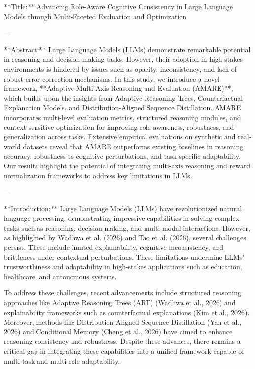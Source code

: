**Title:** Advancing Role-Aware Cognitive Consistency in Large Language Models through Multi-Faceted Evaluation and Optimization

---

**Abstract:**  
Large Language Models (LLMs) demonstrate remarkable potential in reasoning and decision-making tasks. However, their adoption in high-stakes environments is hindered by issues such as opacity, inconsistency, and lack of robust error-correction mechanisms. In this study, we introduce a novel framework, **Adaptive Multi-Axis Reasoning and Evaluation (AMARE)**, which builds upon the insights from Adaptive Reasoning Trees, Counterfactual Explanation Models, and Distribution-Aligned Sequence Distillation. AMARE incorporates multi-level evaluation metrics, structured reasoning modules, and context-sensitive optimization for improving role-awareness, robustness, and generalization across tasks. Extensive empirical evaluations on synthetic and real-world datasets reveal that AMARE outperforms existing baselines in reasoning accuracy, robustness to cognitive perturbations, and task-specific adaptability. Our results highlight the potential of integrating multi-axis reasoning and reward normalization frameworks to address key limitations in LLMs.

---

**Introduction:**  
Large Language Models (LLMs) have revolutionized natural language processing, demonstrating impressive capabilities in solving complex tasks such as reasoning, decision-making, and multi-modal interactions. However, as highlighted by Wadhwa et al. (2026) and Tao et al. (2026), several challenges persist. These include limited explainability, cognitive inconsistency, and brittleness under contextual perturbations. These limitations undermine LLMs' trustworthiness and adaptability in high-stakes applications such as education, healthcare, and autonomous systems.

To address these challenges, recent advancements include structured reasoning approaches like Adaptive Reasoning Trees (ART) (Wadhwa et al., 2026) and explainability frameworks such as counterfactual explanations (Kim et al., 2026). Moreover, methods like Distribution-Aligned Sequence Distillation (Yan et al., 2026) and Conditional Memory (Cheng et al., 2026) have aimed to enhance reasoning consistency and robustness. Despite these advances, there remains a critical gap in integrating these capabilities into a unified framework capable of multi-task and multi-role adaptability.

